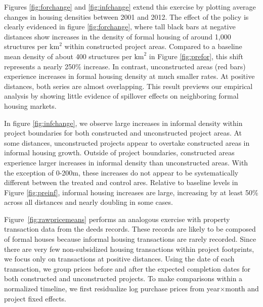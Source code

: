 \documentclass[12pt]{article}
\begin{document}
Figures \ref{fig:forchange} and \ref{fig:infchange} extend this exercise by plotting average changes in housing densities between 2001 and 2012. The effect of the policy is clearly evidenced in figure \ref{fig:forchange}, where tall black bars at negative distances show increases in the density of formal housing of around 1,000 structures per $\text{km}^{2}$ within constructed project areas.  Compared to a baseline mean density of about 400 structures per $\text{km}^{2}$ in Figure \ref{fig:prefor}, this shift represents a nearly 250\% increase. In contrast, unconstructed areas (red bars) experience increases in formal housing density at much smaller rates.
At positive distances, both series are almost overlapping.  This result previews our empirical analysis by showing little evidence of spillover effects on neighboring formal housing markets.

In figure \ref{fig:infchange}, we observe large increases in informal density within project boundaries for both constructed and unconstructed project areas.  At some distances, unconstructed projects appear to overtake constructed areas in informal housing growth.  Outside of project boundaries, constructed areas experience larger increases in informal density than unconstructed areas. With the exception of 0-200m, these increases do not appear to be systematically different between the treated and control ares. 
Relative to baseline levels in Figure \ref{fig:preinf}, informal housing increases are large, increasing by at least 50\% across all distances and nearly doubling in some cases.

Figure~\ref{fig:rawpricemeans} performs an analogous exercise with property transaction data from the deeds records.  These records are likely to be composed of formal houses because informal housing transactions are rarely recorded.  Since there are very few non-subsidized housing transactions within project footprints, we focus only on transactions at positive distances.  Using the date of each transaction, we group prices before and after the expected completion dates for both constructed and unconstructed projects. To make comparisons within a normalized timeline, we first residualize log purchase prices from year$\times$month and project fixed effects.
\end{document}
